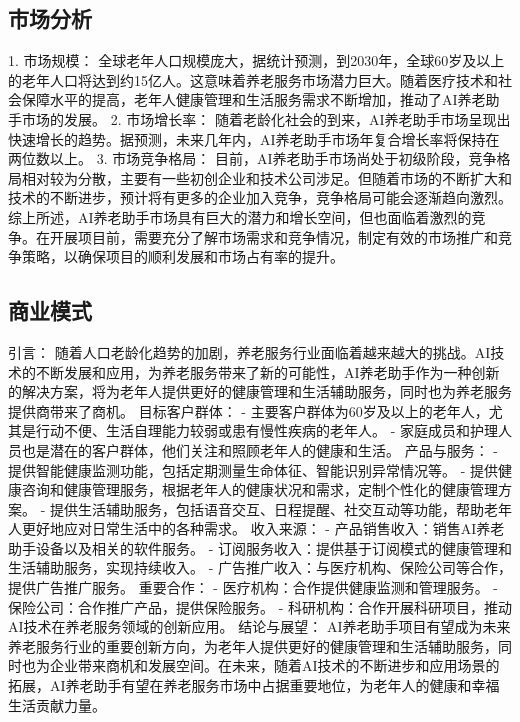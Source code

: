 \subsection{市场分析}
1. 市场规模：
全球老年人口规模庞大，据统计预测，到2030年，全球60岁及以上的老年人口将达到约15亿人。这意味着养老服务市场潜力巨大。随着医疗技术和社会保障水平的提高，老年人健康管理和生活服务需求不断增加，推动了AI养老助手市场的发展。
2. 市场增长率：
随着老龄化社会的到来，AI养老助手市场呈现出快速增长的趋势。据预测，未来几年内，AI养老助手市场年复合增长率将保持在两位数以上。
3. 市场竞争格局：
目前，AI养老助手市场尚处于初级阶段，竞争格局相对较为分散，主要有一些初创企业和技术公司涉足。但随着市场的不断扩大和技术的不断进步，预计将有更多的企业加入竞争，竞争格局可能会逐渐趋向激烈。
综上所述，AI养老助手市场具有巨大的潜力和增长空间，但也面临着激烈的竞争。在开展项目前，需要充分了解市场需求和竞争情况，制定有效的市场推广和竞争策略，以确保项目的顺利发展和市场占有率的提升。
\subsection{商业模式}
引言：
随着人口老龄化趋势的加剧，养老服务行业面临着越来越大的挑战。AI技术的不断发展和应用，为养老服务带来了新的可能性，AI养老助手作为一种创新的解决方案，将为老年人提供更好的健康管理和生活辅助服务，同时也为养老服务提供商带来了商机。
目标客户群体：
- 主要客户群体为60岁及以上的老年人，尤其是行动不便、生活自理能力较弱或患有慢性疾病的老年人。
- 家庭成员和护理人员也是潜在的客户群体，他们关注和照顾老年人的健康和生活。
产品与服务：
- 提供智能健康监测功能，包括定期测量生命体征、智能识别异常情况等。
- 提供健康咨询和健康管理服务，根据老年人的健康状况和需求，定制个性化的健康管理方案。
- 提供生活辅助服务，包括语音交互、日程提醒、社交互动等功能，帮助老年人更好地应对日常生活中的各种需求。
收入来源：
- 产品销售收入：销售AI养老助手设备以及相关的软件服务。
- 订阅服务收入：提供基于订阅模式的健康管理和生活辅助服务，实现持续收入。
- 广告推广收入：与医疗机构、保险公司等合作，提供广告推广服务。
重要合作：
- 医疗机构：合作提供健康监测和管理服务。
- 保险公司：合作推广产品，提供保险服务。
- 科研机构：合作开展科研项目，推动AI技术在养老服务领域的创新应用。
结论与展望：
AI养老助手项目有望成为未来养老服务行业的重要创新方向，为老年人提供更好的健康管理和生活辅助服务，同时也为企业带来商机和发展空间。在未来，随着AI技术的不断进步和应用场景的拓展，AI养老助手有望在养老服务市场中占据重要地位，为老年人的健康和幸福生活贡献力量。
